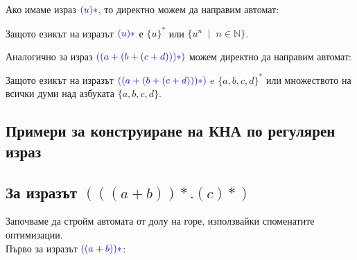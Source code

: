 \documentclass[12pt]{article}
\begin{document}
Ако имаме израз \(\textcolor{blue}{(u)*}\), то директно можем да направим автомат:
\begin{center}
\end{center}
Защото езикът на изразът \(\textcolor{blue}{(u)*}\) е \(\{u\}^*\) или \(\{u^n \;\mid\; n \in \mathbb{N}\}\).\\\par
Аналогично за израз \(\textcolor{blue}{((a + (b + (c + d)))*)}\) можем директно да направим автомат:

\begin{center}
\end{center}
Защото езикът на изразът \(\textcolor{blue}{((a + (b + (c + d)))*)}\) e \(\{a, b, c, d\}^*\) или множеството на всички думи над азбуката \(\{a, b, c, d\}\).


\subsection{Примери за конструиране на КНА по регулярен израз}

\subsection{За изразът \((((a + b))*.(c)*)\)}

Започваме да стройм автомата от долу на горе, използвайки споменатите оптимизации. \\

Първо за изразът \(\textcolor{blue}{((a + b))*}\):

\begin{center}
\end{center}
\end{document}
